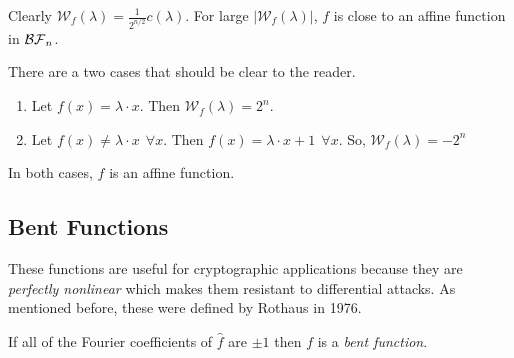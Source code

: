 \par Clearly $\mathcal{W}_f(\lambda)=\frac{1}{2^{n/2}}c(\lambda)$. For large
$|\mathcal{W}_f(\lambda)|$, $f$ is close to an affine function in $\mathcal{BF}_n$.

\begin{example}
  There are a two cases that should be clear to the reader.
  \begin{enumerate}[1.]
    \item Let $f(x)=\lambda\cdot x$. Then $\mathcal{W}_f(\lambda)=2^n$.
    \item Let $f(x)\not=\lambda\cdot x \ \ \forall x$. Then $f(x)=
      \lambda\cdot x+1 \ \ \forall x$. So, $\mathcal{W}_f(\lambda)=-2^n$
  \end{enumerate}
  In both cases, $f$ is an affine function.
\end{example}

\subsection{Bent Functions}
\par These functions are
useful for cryptographic applications because they are \textit{perfectly
nonlinear} which makes them resistant to differential
attacks. As mentioned before, these were defined by Rothaus in 1976.

\begin{definition}\label{def:bent-function}
  If all of the Fourier coefficients of $\hat{f}$ are $\pm1$ then
  $f$ is a \textit{bent function}.
\end{definition}

